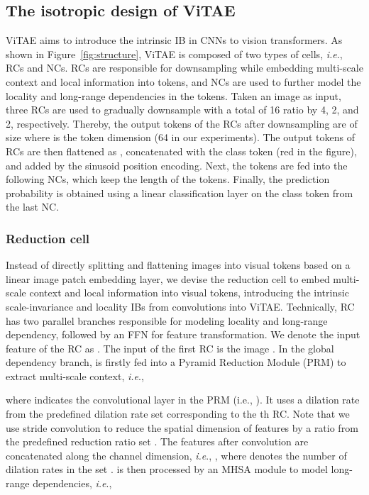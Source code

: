 \documentclass[twocolumn]{svjour3}          \smartqed  \usepackage{natbib}
\newcommand{\ie}{i.e}
\def\onedot{.\xspace}
\def\ie{\emph{i.e}\onedot}
\begin{document}
\subsection{The isotropic design of ViTAE}
ViTAE aims to introduce the intrinsic IB in CNNs to vision transformers. As shown in Figure~\ref{fig:structure}, ViTAE is composed of two types of cells, \ie, RCs and NCs. RCs are responsible for downsampling while embedding multi-scale context and local information into tokens, and NCs are used to further model the locality and long-range dependencies in the tokens. Taken an image  as input, three RCs are used to gradually downsample  with a total of 16 ratio by 4, 2, and 2, respectively. Thereby, the output tokens of the RCs after downsampling are of size  where  is the token dimension (64 in our experiments). The output tokens of RCs are then flattened as , concatenated with the class token (red in the figure), and added by the sinusoid position encoding. Next, the tokens are fed into the following NCs, which keep the length of the tokens. Finally, the prediction probability is obtained using a linear classification layer on the class token from the last NC.

\subsubsection{Reduction cell}
Instead of directly splitting and flattening images into visual tokens based on a linear image patch embedding layer, we devise the reduction cell to embed multi-scale context and local information into visual tokens, introducing the intrinsic scale-invariance and locality IBs from convolutions into ViTAE. Technically, RC has two parallel branches responsible for modeling locality and long-range dependency, followed by an FFN for feature transformation. We denote the input feature of the  RC as . The input of the first RC is the image . In the global dependency branch,  is firstly fed into a Pyramid Reduction Module (PRM) to extract multi-scale context, \ie,

where  indicates the  convolutional layer in the  PRM (i.e., ). It uses a dilation rate  from the predefined dilation rate set  corresponding to the th RC. Note that we use stride convolution to reduce the spatial dimension of features by a ratio  from the predefined reduction ratio set . The features after convolution are concatenated along the channel dimension, \ie, , where  denotes the number of dilation rates in the set .  is then processed by an MHSA module to model long-range dependencies, \ie, 
\end{document}
